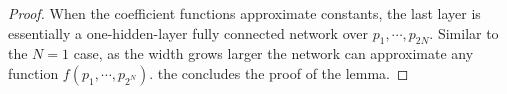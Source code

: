 \begin{proof}

        When the coefficient functions approximate constants, the last layer is essentially a one-hidden-layer fully connected network over $p_1,\cdots,p_{2N}$. Similar to the $N=1$ case, as the width grows larger the network can approximate any function $f(p_1,\cdots,p_{2^N})$. the concludes the proof of the lemma. \qedhere


    \end{proof}

